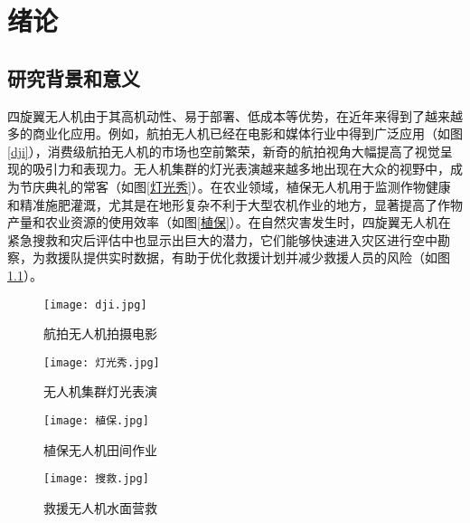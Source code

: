 
\chapter{绪论}
\section{研究背景和意义}

四旋翼无人机由于其高机动性、易于部署、低成本等优势，在近年来得到了越来越多的商业化应用。例如，航拍无人机已经在电影和媒体行业中得到广泛应用（如图\ref{dji}），消费级航拍无人机的市场也空前繁荣，新奇的航拍视角大幅提高了视觉呈现的吸引力和表现力。无人机集群的灯光表演越来越多地出现在大众的视野中，成为节庆典礼的常客（如图\ref{灯光秀}）。在农业领域，植保无人机用于监测作物健康和精准施肥灌溉\cite{tokekar2016agricluture}，尤其是在地形复杂不利于大型农机作业的地方，显著提高了作物产量和农业资源的使用效率（如图\ref{植保}）。在自然灾害发生时，四旋翼无人机在紧急搜救和灾后评估中也显示出巨大的潜力\cite{tomic2012}，它们能够快速进入灾区进行空中勘察，为救援队提供实时数据，有助于优化救援计划并减少救援人员的风险（如图\ref{救援}）。

\begin{figure}[t]
    \centering
    \begin{minipage}[b]{0.49\linewidth}
        \texttt{[image: dji.jpg]}
        \caption{航拍无人机拍摄电影\protect\footnotemark[1]}
        \label{dji}
    \end{minipage}
    \hfill %
    \begin{minipage}[b]{0.49\linewidth}
        \texttt{[image: 灯光秀.jpg]}
        \caption{无人机集群灯光表演\protect\footnotemark[2]}
        \label{灯光秀}
    \end{minipage}

    \vspace{1cm} %

    \begin{minipage}[b]{0.49\linewidth}
        \texttt{[image: 植保.jpg]}
        \caption{植保无人机田间作业\protect\footnotemark[3]}
        \label{植保}
    \end{minipage}
    \hfill
    \begin{minipage}[b]{0.49\linewidth}
        \texttt{[image: 搜救.jpg]}
        \caption{救援无人机水面营救\protect\footnotemark[4]}
        \label{救援}
    \end{minipage}
\end{figure}

